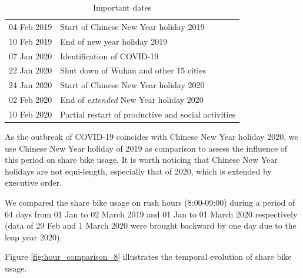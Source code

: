 \documentclass[ijgi,submit,moreauthors,pdftex]{Definitions/mdpi}
\begin{document}
\begin{table}[ht]
    \centering
    \begin{tabular}{ll}
    04 Feb 2019 & Start of Chinese New Year holiday 2019\\
    10 Feb 2019 & End of new year holiday 2019\\
    07 Jan 2020 & Identification of COVID-19\\
    22 Jan 2020 & Shut down of Wuhan and other 15 cities\\
    24 Jan 2020 & Start of Chinese New Year holiday 2020\\
    02 Feb 2020 & End of \textit{extended} New Year holiday 2020\\
    10 Feb 2020 & Partial restart of productive and social activities
    \end{tabular}
    \caption{Important dates}
    \label{tab:important_dates}
\end{table}

As the outbreak of COVID-19 coincides with Chinese New Year holiday 2020, we use Chinese New Year holiday of 2019 as comparison to assess the influence of this period on share bike usage.
It is worth noticing that Chinese New Year holidays are not equi-length, especially that of 2020, which is extended by executive order.

We compared the share bike usage on rush hours (8:00-09:00) during a period of 64 days from 01 Jan to 02 March 2019 and 01 Jan to 01 March 2020 respectively (data of 29 Feb and 1 March 2020 were brought backward by one day due to the leap year 2020).


Figure \ref{fig:hour_comparison_8} %
 illustrates the temporal evolution of share bike usage.
\end{document}
